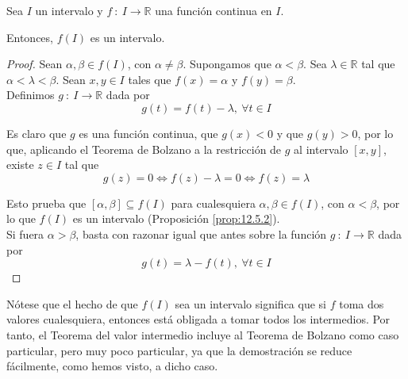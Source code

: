 \begin{prop}
    Sea $I$ un intervalo y $f ~:~ I \longrightarrow \mathbb{R}$ una función continua en $I$.
    
    Entonces, $f(I)$ es un intervalo.
\end{prop}
\begin{proof}
    Sean $\alpha, \beta \in f(I)$, con $\alpha \neq \beta$. Supongamos que $\alpha < \beta$.
    Sea $\lambda \in \mathbb{R}$ tal que $\alpha < \lambda <\beta$. Sean $x,y \in I$ tales que
    $f(x) = \alpha$ y $f(y) = \beta$.\\
    
    Definimos $g ~:~ I \longrightarrow \mathbb{R}$ dada por
    \begin{equation*}
        g(t) = f(t) - \lambda, ~ \forall t \in I
    \end{equation*}
    
    Es claro que $g$ es una función continua, que $g(x) < 0$ y que $g(y) > 0$, por lo que,
    aplicando el Teorema de Bolzano a la restricción de $g$ al intervalo $[x,y]$, existe $z \in I$ tal que
    \begin{equation*}
        g(z) = 0 \Longleftrightarrow f(z) - \lambda = 0 \Longleftrightarrow f(z) = \lambda
    \end{equation*}
    
    Esto prueba que $[\alpha, \beta] \subseteq f(I)$ para cualesquiera $\alpha, \beta \in f(I)$, con $\alpha < \beta$,
    por lo que $f(I)$ es un intervalo (Proposición \ref{prop:12.5.2}).\\
    
    Si fuera $\alpha > \beta$, basta con razonar igual que antes sobre la función
    $g ~:~ I \longrightarrow \mathbb{R}$ dada por
    \begin{equation*}
        g(t) = \lambda - f(t), ~ \forall t \in I
    \end{equation*}
\end{proof}

Nótese que el hecho de que $f(I)$ sea un intervalo significa que si $f$ toma dos valores cualesquiera, entonces está obligada a tomar todos los intermedios. Por tanto, el Teorema del valor intermedio incluye al Teorema de Bolzano como caso particular, pero muy poco particular, ya que la demostración se reduce fácilmente, como hemos visto, a dicho caso.

